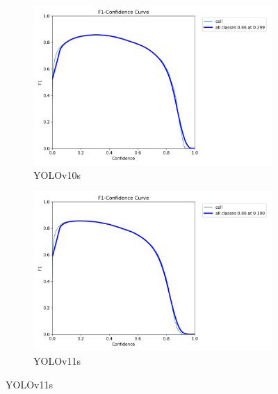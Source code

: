 \documentclass[12pt,a4paper,onecolumn,oneside]{report}
\begin{document}
\begin{figure}[H]
  \vspace{0.5cm}
  \begin{subfigure}[b]{0.48\textwidth}
    \centering
    \includegraphics[width=\textwidth]{figuras/resultados experimentacion/yolov10s/test/BoxF1_curve.png}
    \caption{YOLOv10s}
    \label{fig:yolov10s_test}
  \end{subfigure}
  \hfill
  \begin{subfigure}[b]{0.48\textwidth}
    \centering
    \includegraphics[width=\textwidth]{figuras/resultados experimentacion/yolov11s/test/BoxF1_curve.png}
    \caption{YOLOv11s}
    \label{fig:yolov11s_test}
  \end{subfigure}
  

\end{figure}
\end{document}
